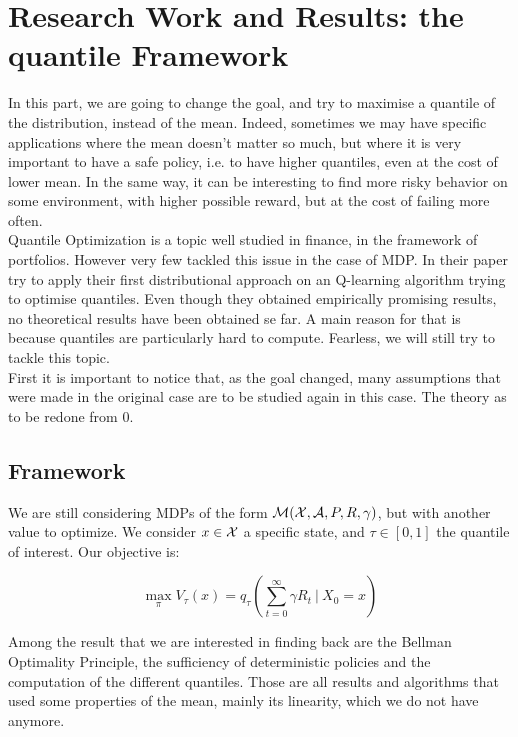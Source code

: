 \section{Research Work and Results: the quantile Framework}

In this part, we are going to change the goal, and try to maximise a quantile of the distribution, instead of the mean. Indeed, sometimes we may have specific applications where the mean doesn’t matter so much, but where it is very important to have a safe policy, i.e. to have higher quantiles, even at the cost of lower mean. In the same way, it can be interesting to find more risky behavior on some environment, with higher possible reward, but at the cost of failing more often.\\

Quantile Optimization is a topic well studied in finance, in the framework of portfolios. However very few tackled this issue in the case of MDP. In their paper \cite[Morimura et al.]{morimura_parametric_2012} try to apply their first distributional approach on an Q-learning algorithm trying to optimise quantiles. Even though they obtained empirically promising results, no theoretical results have been obtained se far. A main reason for that is because quantiles are particularly hard to compute. Fearless, we will still try to tackle this topic.\\

First it is important to notice that, as the goal changed, many assumptions that were made in the original case are to be studied again in this case. The theory as to be redone from 0.

\subsection{Framework}

We are still considering MDPs of the form $\mathcal{M}(\mathcal{X},\mathcal{A}, P,R, \gamma)$, but with another value to optimize. We consider $x \in \mathcal{X}$ a specific state, and $\tau \in [0,1]$ the quantile of interest. Our objective is:

\[\max_\pi V_\tau(x) = q_\tau\left(\sum_{t = 0}^{\infty} \gamma R_t \ |\ X_0 = x\right) \]

Among the result that we are interested in finding back are the Bellman Optimality Principle, the sufficiency of deterministic policies and the computation of the different quantiles. Those are all results and algorithms that used some properties of the mean, mainly its linearity, which we do not have anymore.

